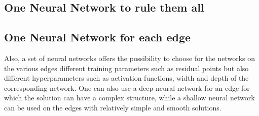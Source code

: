 
\subsection{One Neural Network to rule them all}
\label{ch3:sec1:subsec1}




\subsection{One Neural Network for each edge}
\label{ch3:sec1:subsec2}

Also, a set of neural networks offers the possibility to choose for the networks on the various edges different training parameters such as residual points but also different hyperparameters such as activation functions, width and depth of the corresponding network. One can also use a deep neural network for an edge for which the solution can have a complex structure, while a shallow neural network can be used on the edges with relatively simple and smooth solutions.




